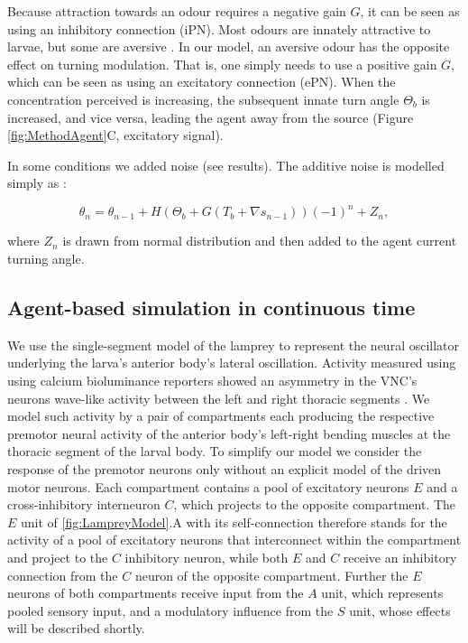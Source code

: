 \documentclass[11pt,a4paper]{article}
\begin{document}
Because attraction towards an odour requires a negative  gain $G$, it can be seen as using an inhibitory connection (iPN).  Most odours are innately attractive to larvae, but some are aversive \citep{hallem2006coding}. In our model, an aversive odour has the opposite effect on turning modulation. That is, one simply needs to use a positive gain $G$, which can be seen as using an excitatory connection (ePN). When the concentration perceived is increasing, the subsequent innate turn angle $\Theta_b$ is increased, and vice versa, leading the agent away from the source (Figure \ref{fig:MethodAgent}C, excitatory signal).

In some conditions we added noise (see results). The additive noise is modelled simply as :

\begin{equation}
\theta_n = \theta_{n-1} + H(\Theta_b + G (T_b + \nabla s_{n-1})){(-1)}^n + Z_n,
\end{equation}

where $Z_n$ is drawn from normal distribution and then added to the agent current turning angle. 
 
\subsection{Agent-based simulation in continuous time}
\label{sec:methodsCoupledOscillator}
We use the single-segment model of the lamprey \citep{lansner1997realistic} to represent the neural oscillator underlying the larva's anterior body's lateral oscillation. Activity measured using using calcium bioluminance reporters  showed an asymmetry in the VNC's neurons wave-like activity between the left and right thoracic segments \citep{berni2015genetic}. We model such activity by a pair of compartments each producing the respective premotor neural activity of the anterior  body's left-right bending muscles at the thoracic segment of the larval body. To simplify our model we consider the response of the premotor neurons only without an explicit model of the driven motor neurons. Each compartment contains a pool of excitatory neurons $E$ and a cross-inhibitory interneuron $C$, which projects to the opposite compartment. The $E$ unit of \ref{fig:LampreyModel}.A with its self-connection therefore stands for the activity of a pool of excitatory neurons that interconnect within the compartment and project to the $C$ inhibitory neuron, while both  $E$ and $C$ receive an inhibitory connection from the $C$ neuron of the opposite compartment. Further the $E$ neurons of both compartments receive input from the $A$ unit, which represents pooled sensory input, and a modulatory influence from the $S$ unit, whose effects will be described shortly.
\end{document}
